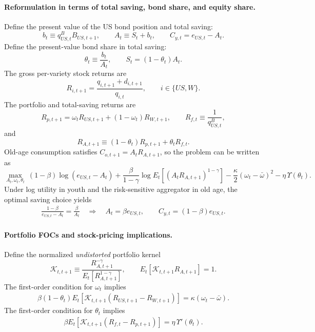 \documentclass{article}
\begin{document}
\paragraph{Reformulation in terms of total saving, bond share, and equity share.}
Define the present value of the US bond position and total saving:
\[
b_t\equiv q^B_{US,t}B_{US,t+1},
\qquad
A_t \equiv S_t+b_t,
\qquad
C_{y,t}=e_{US,t}-A_t.
\]
Define the present-value bond share in total saving:
\[
\theta_t \equiv \frac{b_t}{A_t},
\qquad
S_t=(1-\theta_t)A_t.
\]
The gross per-variety stock returns are
\[
R_{i,t+1}=\frac{q_{i,t+1}+d_{i,t+1}}{q_{i,t}},
\qquad
i\in\{US,W\}.
\]
The portfolio and total-saving returns are
\[
R_{p,t+1}=\omega_t R_{US,t+1}+(1-\omega_t)R_{W,t+1},
\qquad
R_{f,t}\equiv \frac{1}{q^B_{US,t}},
\]
and
\[
R_{A,t+1}\equiv (1-\theta_t)R_{p,t+1}+\theta_t R_{f,t}.
\]
Old-age consumption satisfies $C_{o,t+1}=A_tR_{A,t+1}$, so the problem can be written as
\[
\max_{A_t,\omega_t,\theta_t}
\ (1-\beta)\log(e_{US,t}-A_t)
+\frac{\beta}{1-\gamma}\log E_t\!\left[(A_tR_{A,t+1})^{1-\gamma}\right]
-\frac{\kappa}{2}(\omega_t-\bar\omega)^2
-\eta\,\Upsilon(\theta_t).
\]
Under log utility in youth and the risk-sensitive aggregator in old age, the optimal saving choice yields
\begin{align}\label{US_saving_rule_bond_cost}
\frac{1-\beta}{e_{US,t}-A_t}=\frac{\beta}{A_t}
\quad\Rightarrow\quad
A_t=\beta e_{US,t},
\qquad
C_{y,t}=(1-\beta)e_{US,t}.
\end{align}

\paragraph{Portfolio FOCs and stock-pricing implications.}
Define the normalized \emph{undistorted} portfolio kernel
\begin{equation}\label{US_K_def}
\mathcal K_{t,t+1}
\equiv
\frac{R_{A,t+1}^{-\gamma}}{E_t\!\left[R_{A,t+1}^{1-\gamma}\right]},
\qquad
E_t\!\left[\mathcal K_{t,t+1}R_{A,t+1}\right]=1.
\end{equation}
The first-order condition for $\omega_t$ implies
\begin{align}\label{US_omega_FOC_bond_cost}
\beta(1-\theta_t)
E_t\!\left[\mathcal K_{t,t+1}(R_{US,t+1}-R_{W,t+1})\right]
=
\kappa(\omega_t-\bar\omega).
\end{align}
The first-order condition for $\theta_t$ implies
\begin{align}\label{US_theta_FOC_bond_cost}
\beta
E_t\!\left[\mathcal K_{t,t+1}(R_{f,t}-R_{p,t+1})\right]
=
\eta\,\Upsilon'(\theta_t).
\end{align}
\end{document}
